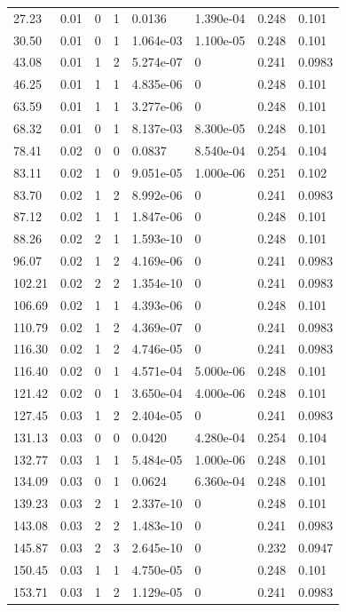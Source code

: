 \documentclass[preview]{standalone}
\begin{document}
{{\begin{tabular}{L{1.2cm}C{1.2cm} C{0.3cm}C{0.5cm} C{1.4cm}C{1.4cm} C{1.4cm}C{1.4cm}}
  27.23  &  0.01  & 0     &  1 &  0.0136  & 1.390e-04  & 0.248 &  0.101   \\ 
  30.50  &  0.01  & 0     &  1 &  1.064e-03  & 1.100e-05  & 0.248 &  0.101   \\ 
  43.08  &  0.01  & 1     &  2 &  5.274e-07  & 0  & 0.241 &  0.0983   \\ 
  46.25  &  0.01  & 1     &  1 &  4.835e-06  & 0  & 0.248 &  0.101   \\ 
  63.59  &  0.01  & 1     &  1 &  3.277e-06  & 0  & 0.248 &  0.101   \\ 
  68.32  &  0.01  & 0     &  1 &  8.137e-03  & 8.300e-05  & 0.248 &  0.101   \\ 
  78.41  &  0.02  & 0     &  0 &  0.0837  & 8.540e-04  & 0.254 &  0.104   \\ 
  83.11  &  0.02  & 1     &  0 &  9.051e-05  & 1.000e-06  & 0.251 &  0.102   \\ 
  83.70  &  0.02  & 1     &  2 &  8.992e-06  & 0  & 0.241 &  0.0983   \\ 
  87.12  &  0.02  & 1     &  1 &  1.847e-06  & 0  & 0.248 &  0.101   \\ 
  88.26  &  0.02  & 2     &  1 &  1.593e-10  & 0  & 0.248 &  0.101   \\ 
  96.07  &  0.02  & 1     &  2 &  4.169e-06  & 0  & 0.241 &  0.0983   \\ 
  102.21  &  0.02  & 2     &  2 &  1.354e-10  & 0  & 0.241 &  0.0983   \\ 
  106.69  &  0.02  & 1     &  1 &  4.393e-06  & 0  & 0.248 &  0.101   \\ 
  110.79  &  0.02  & 1     &  2 &  4.369e-07  & 0  & 0.241 &  0.0983   \\ 
  116.30  &  0.02  & 1     &  2 &  4.746e-05  & 0  & 0.241 &  0.0983   \\ 
  116.40  &  0.02  & 0     &  1 &  4.571e-04  & 5.000e-06  & 0.248 &  0.101   \\ 
  121.42  &  0.02  & 0     &  1 &  3.650e-04  & 4.000e-06  & 0.248 &  0.101   \\ 
  127.45  &  0.03  & 1     &  2 &  2.404e-05  & 0  & 0.241 &  0.0983   \\ 
  131.13  &  0.03  & 0     &  0 &  0.0420  & 4.280e-04  & 0.254 &  0.104   \\ 
  132.77  &  0.03  & 1     &  1 &  5.484e-05  & 1.000e-06  & 0.248 &  0.101   \\ 
  134.09  &  0.03  & 0     &  1 &  0.0624  & 6.360e-04  & 0.248 &  0.101   \\ 
  139.23  &  0.03  & 2     &  1 &  2.337e-10  & 0  & 0.248 &  0.101   \\ 
  143.08  &  0.03  & 2     &  2 &  1.483e-10  & 0  & 0.241 &  0.0983   \\ 
  145.87  &  0.03  & 2     &  3 &  2.645e-10  & 0  & 0.232 &  0.0947   \\ 
  150.45  &  0.03  & 1     &  1 &  4.750e-05  & 0  & 0.248 &  0.101   \\ 
  153.71  &  0.03  & 1     &  2 &  1.129e-05  & 0  & 0.241 &  0.0983   \\ 
\hline 
\end{tabular} 

}}
\end{document}

